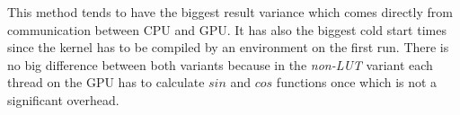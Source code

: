 This method tends to have the biggest result variance which comes directly from communication between CPU and GPU. It has also the biggest cold start times since the kernel has to be compiled by an environment on the first run. There is no big difference between both variants because in the \textit{non-LUT} variant each thread on the GPU has to calculate $sin$ and $cos$ functions once which is not a significant overhead.

